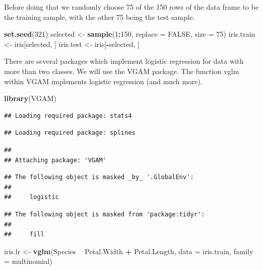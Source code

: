 \documentclass[]{article}
\newenvironment{Shaded}{\begin{snugshade}}{\end{snugshade}}
\newcommand{\KeywordTok}[1]{\textcolor[rgb]{0.13,0.29,0.53}{\textbf{#1}}}
\newcommand{\DataTypeTok}[1]{\textcolor[rgb]{0.13,0.29,0.53}{#1}}
\newcommand{\DecValTok}[1]{\textcolor[rgb]{0.00,0.00,0.81}{#1}}
\newcommand{\StringTok}[1]{\textcolor[rgb]{0.31,0.60,0.02}{#1}}
\newcommand{\OtherTok}[1]{\textcolor[rgb]{0.56,0.35,0.01}{#1}}
\newcommand{\OperatorTok}[1]{\textcolor[rgb]{0.81,0.36,0.00}{\textbf{#1}}}
\newcommand{\NormalTok}[1]{#1}
\begin{document}
Before doing that we randomly choose 75 of the 150 rows of the data
frame to be the training sample, with the other 75 being the test
sample.

\begin{Shaded}
\begin{Highlighting}[]
\KeywordTok{set.seed}\NormalTok{(}\DecValTok{321}\NormalTok{)}
\NormalTok{selected <-}\StringTok{ }\KeywordTok{sample}\NormalTok{(}\DecValTok{1}\OperatorTok{:}\DecValTok{150}\NormalTok{, }\DataTypeTok{replace =} \OtherTok{FALSE}\NormalTok{, }\DataTypeTok{size =} \DecValTok{75}\NormalTok{)}
\NormalTok{iris.train <-}\StringTok{ }\NormalTok{iris[selected, ]}
\NormalTok{iris.test <-}\StringTok{ }\NormalTok{iris[}\OperatorTok{-}\NormalTok{selected, ]}
\end{Highlighting}
\end{Shaded}

There are several packages which implement logistic regression for data
with more than two classes. We will use the VGAM package. The function
vglm within VGAM implements logistic regression (and much more).

\begin{Shaded}
\begin{Highlighting}[]
\KeywordTok{library}\NormalTok{(VGAM)}
\end{Highlighting}
\end{Shaded}

\begin{verbatim}
## Loading required package: stats4
\end{verbatim}

\begin{verbatim}
## Loading required package: splines
\end{verbatim}

\begin{verbatim}
## 
## Attaching package: 'VGAM'
\end{verbatim}

\begin{verbatim}
## The following object is masked _by_ '.GlobalEnv':
## 
##     logistic
\end{verbatim}

\begin{verbatim}
## The following object is masked from 'package:tidyr':
## 
##     fill
\end{verbatim}

\begin{Shaded}
\begin{Highlighting}[]
\NormalTok{iris.lr <-}\StringTok{ }\KeywordTok{vglm}\NormalTok{(Species }\OperatorTok{~}\StringTok{ }\NormalTok{Petal.Width }\OperatorTok{+}\StringTok{ }\NormalTok{Petal.Length, }\DataTypeTok{data =}\NormalTok{ iris.train, }\DataTypeTok{family =}\NormalTok{ multinomial)}
\end{Highlighting}
\end{Shaded}
\end{document}
